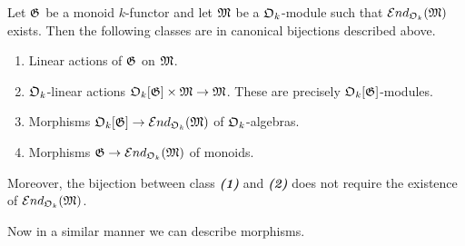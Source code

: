 \begin{proposition}\label{proposition:decription_of_linear_monoid_actions_on_modules}
Let ${\mathfrak G}$ be a monoid $k$-functor and let ${\mathfrak M}$ be a ${\mathfrak O}_k$-module such that ${\mathcal E} nd_{{\mathfrak O}_k}({\mathfrak M})$ exists. Then the following classes are in canonical bijections described above.
\begin{enumerate}[label=\emph{\textbf{(\arabic*)}}, leftmargin=3.0em]
\item Linear actions of ${\mathfrak G}$ on ${\mathfrak M}$.
\item ${\mathfrak O}_k$-linear actions ${\mathfrak O}_k[{\mathfrak G}]\times {\mathfrak M}\rightarrow {\mathfrak M}$. These are precisely ${\mathfrak O}_k[{\mathfrak G}]$-modules.
\item Morphisms ${\mathfrak O}_k[{\mathfrak G}]\rightarrow {\mathcal E} nd_{{\mathfrak O}_k}({\mathfrak M})$ of ${\mathfrak O}_k$-algebras.
\item Morphisms ${\mathfrak G}\rightarrow {\mathcal E} nd_{{\mathfrak O}_k}({\mathfrak M})$ of monoids.
\end{enumerate}
Moreover, the bijection between class \emph{\textbf{(1)}} and \emph{\textbf{(2)}} does not require the existence of ${\mathcal E} nd_{{\mathfrak O}_k}({\mathfrak M})$.
\end{proposition}
\noindent
Now in a similar manner we can describe morphisms.

